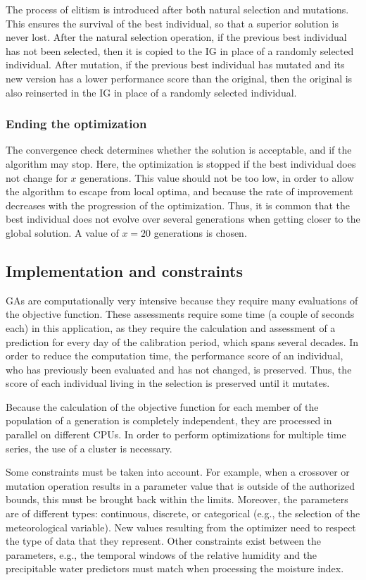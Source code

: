 \documentclass{ametsoc}
\begin{document}
The process of elitism is introduced after both natural selection and mutations. This ensures the survival of the best individual, so that a superior solution is never lost. After the natural selection operation, if the previous best individual has not been selected, then it is copied to the IG in place of a randomly selected individual. After mutation, if the previous best individual has mutated and its new version has a lower performance score than the original, then the original is also reinserted in the IG in place of a randomly selected individual.


\subsubsection{Ending the optimization}

The convergence check determines whether the solution is acceptable, and if the algorithm may stop. Here, the optimization is stopped if the best individual does not change for $x$ generations. This value should not be too low, in order to allow the algorithm to escape from local optima, and because the rate of improvement decreases with the progression of the optimization. Thus, it is common that the best individual does not evolve over several generations when getting closer to the global solution. A value of $x=20$ generations is chosen.


\subsection{Implementation and constraints}

GAs are computationally very intensive because they require many evaluations of the objective function. These assessments require some time (a couple of seconds each) in this application, as they require the calculation and assessment of a prediction for every day of the calibration period, which spans several decades. In order to reduce the computation time, the performance score of an individual, who has previously been evaluated and has not changed, is preserved. Thus, the score of each individual living in the selection is preserved until it mutates.

Because the calculation of the objective function for each member of the population of a generation is completely independent, they are processed in parallel on different CPUs. In order to perform optimizations for multiple time series, the use of a cluster is necessary.

Some constraints must be taken into account. For example, when a crossover or mutation operation results in a parameter value that is outside of the authorized bounds, this must be brought back within the limits. Moreover, the parameters are of different types: continuous, discrete, or categorical (e.g., the selection of the meteorological variable). New values resulting from the optimizer need to respect the type of data that they represent. Other constraints exist between the parameters, e.g., the temporal windows of the relative humidity and the precipitable water predictors must match when processing the moisture index.
\end{document}
